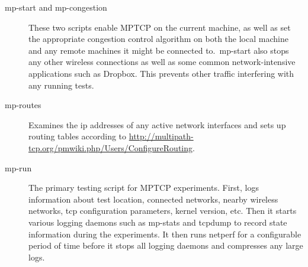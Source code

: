 \begin{description}
  \item[mp-start and mp-congestion]
    These two scripts enable MPTCP on the current machine, as well as set the
    appropriate congestion control algorithm on both the local machine and any
    remote machines it might be connected to.\ mp-start also stops any other
    wireless connections as well as some common network-intensive applications
    such as Dropbox. This prevents other traffic interfering with any running
    tests.
  \item[mp-routes]
    Examines the ip addresses of any active network interfaces and sets up
    routing tables according to
    \href{http://multipath-tcp.org/pmwiki.php/Users/ConfigureRouting}{http://multipath-tcp.org/\-pmwiki.php/\-Users/\-ConfigureRouting}.
  \item[mp-run]
    The primary testing script for MPTCP experiments. First, logs information
    about test location, connected networks, nearby wireless networks, tcp
    configuration parameters, kernel version, etc. Then it starts various
    logging daemons such as mp-stats and tcpdump to record state information
    during the experiments. It then runs netperf for a configurable period of
    time before it stops all logging daemons and compresses any large logs.


\end{description}
